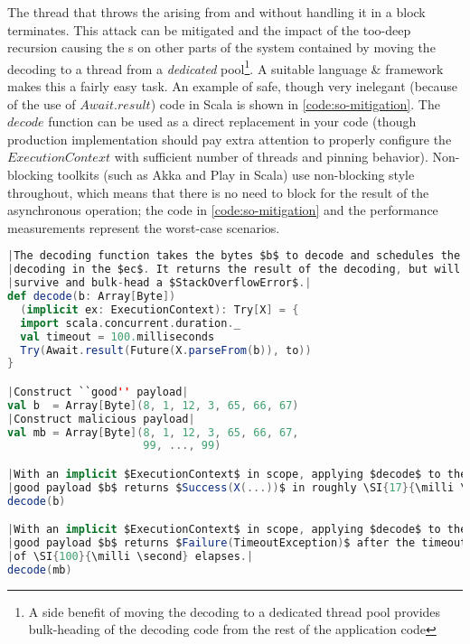 The thread that throws the  arising from  and  without handling it in a  block terminates. This attack can be mitigated and the impact of the too-deep recursion causing the s on other parts of the system contained by moving the decoding to a thread from a \emph{dedicated} pool\footnote{A side benefit of moving the decoding to a dedicated thread pool provides bulk-heading of the decoding code from the rest of the application code}. A suitable language \& framework makes this a fairly easy task. An example of safe, though very inelegant (because of the use of $Await.result$) code in Scala is shown in \autoref{code:so-mitigation}. The $decode$ function can be used as a direct replacement in your code (though production implementation should pay extra attention to properly configure the $ExecutionContext$ with sufficient number of threads and pinning behavior). Non-blocking toolkits (such as Akka\cite{akka} and Play\cite{play} in Scala) use non-blocking style throughout, which means that there is no need to block for the result of the asynchronous operation; the code in \autoref{code:so-mitigation} and the performance measurements represent the worst-case scenarios.

\begin{lstlisting}[caption={Stack Overflow Mitigation}, label={code:so-mitigation}, language=Scala, escapechar=|]
|The decoding function takes the bytes $b$ to decode and schedules the|
|decoding in the $ec$. It returns the result of the decoding, but will|
|survive and bulk-head a $StackOverflowError$.|
def decode(b: Array[Byte])
  (implicit ex: ExecutionContext): Try[X] = {
  import scala.concurrent.duration._
  val timeout = 100.milliseconds
  Try(Await.result(Future(X.parseFrom(b)), to))
}

|Construct ``good'' payload|
val b  = Array[Byte](8, 1, 12, 3, 65, 66, 67)
|Construct malicious payload|
val mb = Array[Byte](8, 1, 12, 3, 65, 66, 67, 
                     99, ..., 99)

|With an implicit $ExecutionContext$ in scope, applying $decode$ to the|
|good payload $b$ returns $Success(X(...))$ in roughly \SI{17}{\milli \second}.|
decode(b)

|With an implicit $ExecutionContext$ in scope, applying $decode$ to the|
|good payload $b$ returns $Failure(TimeoutException)$ after the timeout|
|of \SI{100}{\milli \second} elapses.|
decode(mb)
\end{lstlisting}

